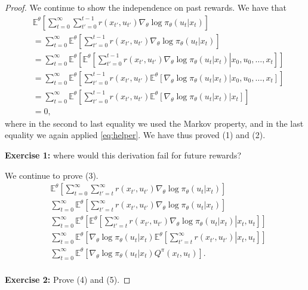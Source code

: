 \begin{proof}
We continue to show the independence on past rewards. We have that
\begin{equation*}
\begin{split}
& {\mathbb E^\theta }\left[ \sum_{t=0}^\infty \sum_{t'=0}^{t-1} r(x_{t'},u_{t'}) {{\nabla _\theta }\log {\pi _\theta }({u_t}|{x_t})} \right] \\
&= \sum_{t=0}^\infty {\mathbb E^\theta }\left[ \sum_{t'=0}^{t-1} r(x_{t'},u_{t'}) {{\nabla _\theta }\log {\pi _\theta }({u_t}|{x_t})} \right] \\
&= \sum_{t=0}^\infty {\mathbb E^\theta }\left[ {\mathbb E^\theta }\left[ \left. \sum_{t'=0}^{t-1} r(x_{t'},u_{t'}) {{\nabla _\theta }\log {\pi _\theta }({u_t}|{x_t})} \right| x_0,u_0,\dots,x_t \right]\right] \\
&= \sum_{t=0}^\infty {\mathbb E^\theta }\left[ \sum_{t'=0}^{t-1} r(x_{t'},u_{t'}) {\mathbb E^\theta }\left[ \left. {{\nabla _\theta }\log {\pi _\theta }({u_t}|{x_t})} \right| x_0,u_0,\dots,x_t \right]\right] \\
&= \sum_{t=0}^\infty {\mathbb E^\theta }\left[ \sum_{t'=0}^{t-1} r(x_{t'},u_{t'}) {\mathbb E^\theta }\left[ \left. {{\nabla _\theta }\log {\pi _\theta }({u_t}|{x_t})} \right| x_t \right]\right] \\
&=0, 
\end{split}    
\end{equation*}
where in the second to last equality we used the Markov property, and in the last equality we again applied \eqref{eq:helper}. We have thus proved (1) and (2).

\textbf{Exercise 1:} where would this derivation fail for future rewards?

We continue to prove (3).
\begin{equation*}
\begin{split}
& {\mathbb E^\theta }\left[ \sum_{t=0}^\infty \sum_{t'=t}^{\infty} r(x_{t'},u_{t'}) {{\nabla _\theta }\log {\pi _\theta }({u_t}|{x_t})} \right] \\
& \sum_{t=0}^\infty {\mathbb E^\theta }\left[ \sum_{t'=t}^{\infty} r(x_{t'},u_{t'}) {{\nabla _\theta }\log {\pi _\theta }({u_t}|{x_t})} \right] \\
& \sum_{t=0}^\infty {\mathbb E^\theta }\left[ {\mathbb E^\theta }\left[ \left. \sum_{t'=t}^{\infty} r(x_{t'},u_{t'}) {{\nabla _\theta }\log {\pi _\theta }({u_t}|{x_t})}\right| x_t, u_t\right] \right] \\
& \sum_{t=0}^\infty {\mathbb E^\theta }\left[ {{\nabla _\theta }\log {\pi _\theta }({u_t}|{x_t})} {\mathbb E^\theta }\left[ \left. \sum_{t'=t}^{\infty} r(x_{t'},u_{t'}) \right| x_t, u_t\right] \right] \\
& \sum_{t=0}^\infty {\mathbb E^\theta }\left[ {{\nabla _\theta }\log {\pi _\theta }({u_t}|{x_t})} Q^\pi(x_t,u_t) \right]. \\
\end{split}    
\end{equation*}

\textbf{Exercise 2:} Prove (4) and (5).

\end{proof}

